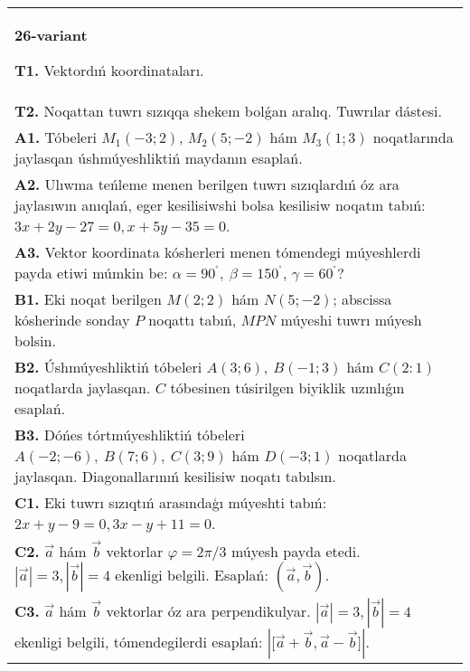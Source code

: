 \documentclass{article}
\begin{document}
\begin{tabular}{m{17cm}}
\textbf{26-variant}

\textbf{T1.} 
Vektordıń koordinataları.
 \\
\textbf{T2.} 
Noqattan tuwrı sızıqqa shekem bolǵan aralıq. Tuwrılar dástesi.
 \\
\textbf{A1.} 
Tóbeleri $M_1 (-3;2) $, $M_2 (5;-2) $ hám $M_3 (1;3) $
noqatlarında jaylasqan úshmúyeshliktiń maydanın esaplań.
 \\
\textbf{A2.} 
Ulıwma teńleme menen berilgen tuwrı sızıqlardıń
óz ara jaylasıwın anıqlań, eger kesilisiwshi bolsa kesilisiw noqatın
tabıń: $3x+2y-27=0, x+5y-35=0$.
 \\
\textbf{A3.} 
Vektor koordinata kósherleri menen tómendegi múyeshlerdi payda etiwi
múmkin be: $\alpha = 90^{{^\circ}},\ \beta = 150^{{^\circ}}$,
$\gamma = 60^{{^\circ}}?$
 \\
\textbf{B1.} 
Eki noqat berilgen \(M (2;2) \) hám \(N (5;-2) \); abscissa kósherinde sonday $P$ noqattı tabıń, $MPN$ múyeshi tuwrı múyesh bolsin.
 \\
\textbf{B2.} 
Úshmúyeshliktiń tóbeleri \(A (3;6),\ B (-1;3) \) hám
\(C (2: 1) \) noqatlarda jaylasqan. $C$ tóbesinen túsirilgen biyiklik uzınlıǵın esaplań.
 \\
\textbf{B3.} 
Dóńes tórtmúyeshliktiń tóbeleri
\(A (-2;-6),\ B (7;6),\ C (3;9) \) hám \(D (-3;1) \) noqatlarda
jaylasqan. Diagonallarınıń kesilisiw noqatı tabılsın.
 \\
\textbf{C1.} 
Eki tuwrı sızıqtıń arasındaģı múyeshti tabıń: $2x+y-9=0, 3x-y+11=0$.
 \\
\textbf{C2.} 
$\vec{a}$ hám $\vec{b}$ vektorlar $\varphi = 2\pi/3$ múyesh payda etedi. $|\vec{a}| = 3,|\vec{b}| = 4$ ekenligi belgili. Esaplań:
$\left(\vec{a},\vec{b} \right) $.
 \\
\textbf{C3.} 
$\vec{a}$ hám $\vec{b}$ vektorlar óz ara perpendikulyar. $|\vec{a}| = 3,|\vec{b}| = 4$ ekenligi belgili, tómendegilerdi esaplań:
$|\lbrack\vec{a} + \vec{b},\vec{a} - \vec{b}\rbrack|$.
 \\

\end{tabular}
\vspace{1cm}
\end{document}
